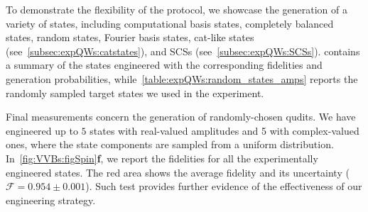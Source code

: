 To demonstrate the flexibility of the protocol, we showcase the generation of a variety of states, including
computational basis states, completely balanced states, random states, Fourier basis states, cat-like states (see~\cref{subsec:expQWs:catstates}), and \acp{SCS} (see~\cref{subsec:expQWs:SCSs}).
 contains a summary of the states engineered with the corresponding fidelities and generation probabilities,
while~\cref{table:expQWs:random_states_amps} reports the randomly sampled target states we used in the experiment.



Final measurements concern the generation of randomly-chosen qudits. We have engineered up to $5$ states with real-valued amplitudes and 5 with complex-valued ones, where the state components are sampled from a uniform distribution.
In~\cref{fig:VVBs:figSpin}\textbf{f}, we report the fidelities for all the experimentally engineered states.
The red area shows the average fidelity and its uncertainty ($\mathcal{F}{=}0.954 \pm 0.001$). Such test provides further evidence of the effectiveness of our engineering strategy.

